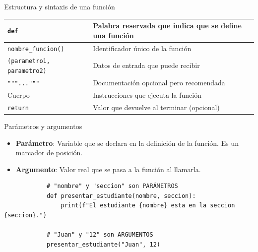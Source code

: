 \documentclass{beamer}
\begin{document}
    \begin{frame}[fragile, t]{Estructura y sintaxis de una función}
        \centering
        \begin{tabular}{|p{4.5cm}|p{5cm}|}
            \hline
            \texttt{def} & Palabra reservada que indica que se define una función \\ \hline
            \texttt{nombre_funcion()} & Identificador único de la función \\ \hline
            \texttt{(parametro1, parametro2)} & Datos de entrada que puede recibir \\ \hline
            \texttt{"""..."""} & Documentación opcional pero recomendada \\ \hline
            Cuerpo & Instrucciones que ejecuta la función \\ \hline
            \texttt{return} & Valor que devuelve al terminar (opcional) \\ \hline
        \end{tabular}
    \end{frame}
    
    \begin{frame}[fragile, t]{Parámetros y argumentos}
        \begin{itemize}
            \item \textbf{Parámetro}: Variable que se declara en la definición de la función. Es un marcador de posición.
            \item \textbf{Argumento}: Valor real que se pasa a la función al llamarla.
        \end{itemize}
        \begin{verbatim}   
            # "nombre" y "seccion" son PARÁMETROS
            def presentar_estudiante(nombre, seccion):
                print(f"El estudiante {nombre} esta en la seccion {seccion}.")
            
            # "Juan" y "12" son ARGUMENTOS
            presentar_estudiante("Juan", 12)
        \end{verbatim}
    \end{frame}
\end{document}
